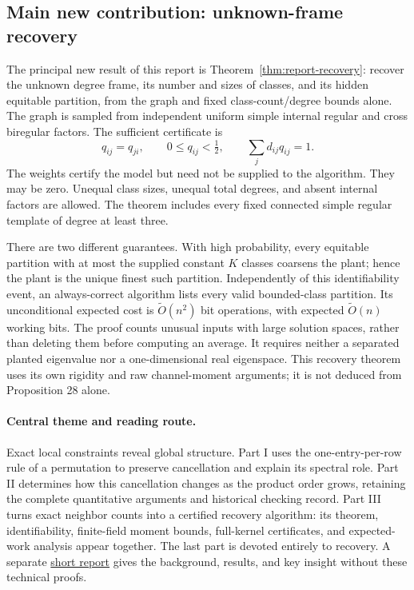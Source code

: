 \documentclass[11pt]{article}
\theoremstyle{definition}
\theoremstyle{remark}
\newcommand{\1}{\mathbf 1}
\begin{document}
\subsection{Main new contribution: unknown-frame recovery}
The principal new result of this report is
Theorem~\ref{thm:report-recovery}: recover the unknown degree frame,
its number and sizes of classes, and its hidden equitable partition,
from the graph and fixed class-count/degree bounds alone. The graph is
sampled from independent uniform simple internal regular and cross
biregular factors. The sufficient certificate is
\[
 q_{ij}=q_{ji},\qquad 0\le q_{ij}<\tfrac12,\qquad
                          \sum_jd_{ij}q_{ij}=1.
\]
The weights certify the model but need not be supplied to the algorithm.
They may be zero. Unequal class sizes, unequal total degrees, and absent
internal factors are allowed. The theorem includes every fixed connected
simple regular template of degree at least three.

There are two different guarantees. With high probability, every equitable
partition with at most the supplied constant $K$ classes coarsens the
plant; hence the plant is the unique finest such partition. Independently
of this identifiability event, an always-correct algorithm lists every
valid bounded-class partition. Its unconditional expected cost is
$\widetilde O(n^2)$ bit operations, with expected
$\widetilde O(n)$ working bits. The proof counts unusual inputs with large
solution spaces, rather than deleting them before computing an average.
It requires neither a separated planted eigenvalue nor a one-dimensional
real eigenspace. This recovery theorem uses its own rigidity and raw
channel-moment arguments; it is not deduced from Proposition 28 alone.

\paragraph{Central theme and reading route.}
Exact local constraints reveal global structure. Part I uses the one-entry-per-row
rule of a permutation to preserve cancellation and explain its spectral role.
Part II determines how this cancellation changes as the product order grows,
retaining the complete quantitative arguments and historical checking record.
Part III turns exact neighbor counts into a certified recovery algorithm:
its theorem, identifiability, finite-field moment bounds, full-kernel certificates,
and expected-work analysis appear together. The last part is devoted entirely
to recovery. A separate \href{report-short.pdf}{short report} gives the background,
results, and key insight without these technical proofs.
\end{document}
